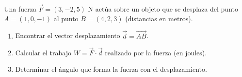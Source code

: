 Una fuerza $\vec{F} = (3, -2, 5)$ N actúa sobre un objeto que se desplaza del punto $A = (1, 0, -1)$ al punto $B = (4, 2, 3)$ (distancias en metros).
\begin{enumerate}
    \item Encontrar el vector desplazamiento $\vec{d} = \overrightarrow{AB}$.
    \item Calcular el trabajo $W = \vec{F} \cdot \vec{d}$ realizado por la fuerza (en joules).
    \item Determinar el ángulo que forma la fuerza con el desplazamiento.
\end{enumerate}